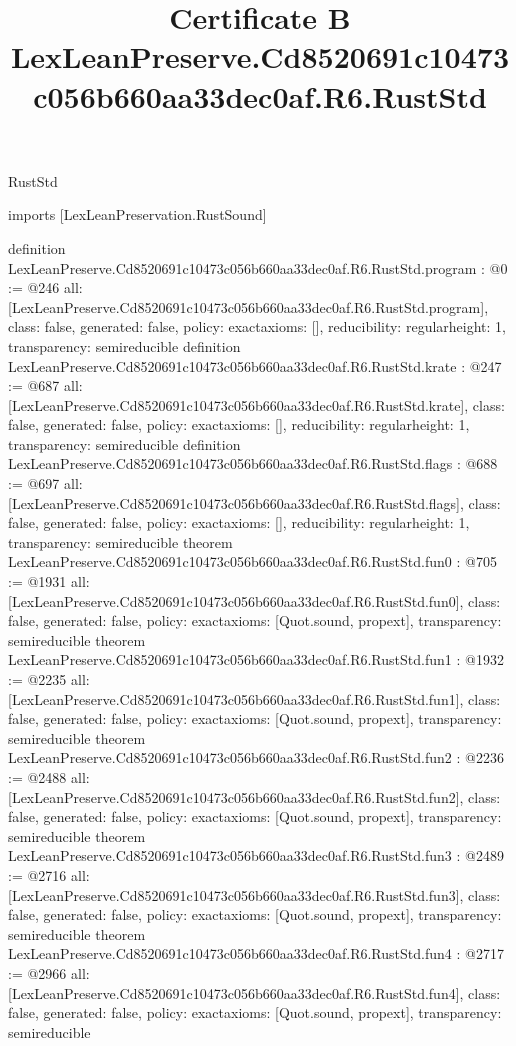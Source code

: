 \begin{lexlean}{RustStd}
\title{Certificate B LexLeanPreserve.Cd8520691c10473c056b660aa33dec0af.R6.RustStd}
\begin{coremodule}
imports [LexLeanPreservation.RustSound]

definition LexLeanPreserve.Cd8520691c10473c056b660aa33dec0af.R6.RustStd.program : @0 := @246 {
  all: [LexLeanPreserve.Cd8520691c10473c056b660aa33dec0af.R6.RustStd.program],
  class: false,
  generated: false,
  policy: exact{axioms: []},
  reducibility: regular{height: 1},
  transparency: semireducible
}
definition LexLeanPreserve.Cd8520691c10473c056b660aa33dec0af.R6.RustStd.krate : @247 := @687 {
  all: [LexLeanPreserve.Cd8520691c10473c056b660aa33dec0af.R6.RustStd.krate],
  class: false,
  generated: false,
  policy: exact{axioms: []},
  reducibility: regular{height: 1},
  transparency: semireducible
}
definition LexLeanPreserve.Cd8520691c10473c056b660aa33dec0af.R6.RustStd.flags : @688 := @697 {
  all: [LexLeanPreserve.Cd8520691c10473c056b660aa33dec0af.R6.RustStd.flags],
  class: false,
  generated: false,
  policy: exact{axioms: []},
  reducibility: regular{height: 1},
  transparency: semireducible
}
theorem LexLeanPreserve.Cd8520691c10473c056b660aa33dec0af.R6.RustStd.fun0 : @705 := @1931 {
  all: [LexLeanPreserve.Cd8520691c10473c056b660aa33dec0af.R6.RustStd.fun0],
  class: false,
  generated: false,
  policy: exact{axioms: [Quot.sound, propext]},
  transparency: semireducible
}
theorem LexLeanPreserve.Cd8520691c10473c056b660aa33dec0af.R6.RustStd.fun1 : @1932 := @2235 {
  all: [LexLeanPreserve.Cd8520691c10473c056b660aa33dec0af.R6.RustStd.fun1],
  class: false,
  generated: false,
  policy: exact{axioms: [Quot.sound, propext]},
  transparency: semireducible
}
theorem LexLeanPreserve.Cd8520691c10473c056b660aa33dec0af.R6.RustStd.fun2 : @2236 := @2488 {
  all: [LexLeanPreserve.Cd8520691c10473c056b660aa33dec0af.R6.RustStd.fun2],
  class: false,
  generated: false,
  policy: exact{axioms: [Quot.sound, propext]},
  transparency: semireducible
}
theorem LexLeanPreserve.Cd8520691c10473c056b660aa33dec0af.R6.RustStd.fun3 : @2489 := @2716 {
  all: [LexLeanPreserve.Cd8520691c10473c056b660aa33dec0af.R6.RustStd.fun3],
  class: false,
  generated: false,
  policy: exact{axioms: [Quot.sound, propext]},
  transparency: semireducible
}
theorem LexLeanPreserve.Cd8520691c10473c056b660aa33dec0af.R6.RustStd.fun4 : @2717 := @2966 {
  all: [LexLeanPreserve.Cd8520691c10473c056b660aa33dec0af.R6.RustStd.fun4],
  class: false,
  generated: false,
  policy: exact{axioms: [Quot.sound, propext]},
  transparency: semireducible
}
\end{coremodule}
\end{lexlean}
